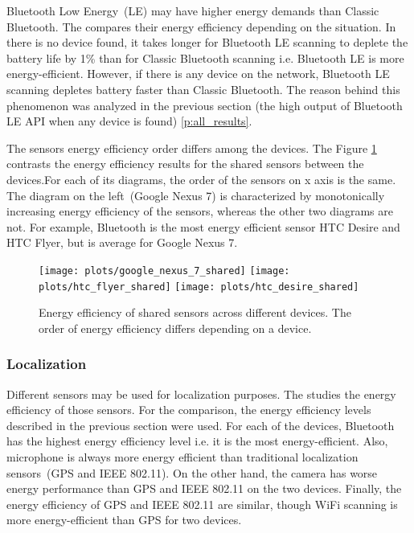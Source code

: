 Bluetooth Low Energy\ (LE) may have higher energy demands than Classic Bluetooth. The  compares their energy efficiency depending on the situation. In there is no device found, it takes longer for Bluetooth LE scanning to deplete the battery life by 1\% than for Classic Bluetooth scanning i.e. Bluetooth LE is more energy-efficient. However, if there is any device on the network, Bluetooth LE scanning depletes battery faster than Classic Bluetooth. The reason behind this phenomenon was analyzed in the previous section (the high output of Bluetooth LE API when any device is found) \ref{p:all_results}.
	
				
The sensors energy efficiency order differs among the devices. The Figure \ref{p:shared_sensors_results} contrasts the energy efficiency results for the shared sensors between the devices.For each of its diagrams, the order of the sensors on x axis is the same. The diagram on the left\ (Google Nexus 7) is characterized by monotonically increasing energy efficiency of the sensors, whereas the other two diagrams are not. For example, Bluetooth is the most energy efficient sensor HTC Desire and HTC Flyer, but is average for Google Nexus 7.
	
\begin{figure}[H]
\centering
\texttt{[image: plots/google\_nexus\_7\_shared]}
\texttt{[image: plots/htc\_flyer\_shared]}
\texttt{[image: plots/htc\_desire\_shared]}
\caption{\label{p:shared_sensors_results} Energy efficiency of shared sensors across different devices. The order of energy efficiency differs depending on a device. }
\end{figure}		
		
\subsubsection{Localization}

Different sensors may be used for localization purposes. The  studies the energy efficiency of those sensors. For the comparison, the energy efficiency levels described in the previous section were used. For each of the devices, Bluetooth has the highest energy efficiency level i.e. it is the most energy-efficient. Also, microphone is always more energy efficient than traditional localization sensors\ (GPS and IEEE 802.11). On the other hand, the camera has worse energy performance than GPS and IEEE 802.11 on the two devices. Finally, the energy efficiency of GPS and IEEE 802.11 are similar, though WiFi scanning is more energy-efficient than GPS for two devices.  	

